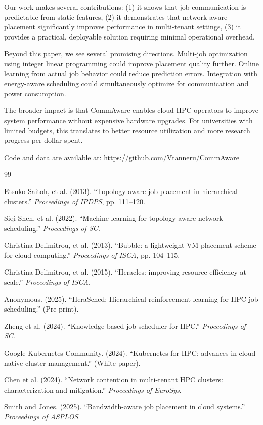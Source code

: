 \documentclass[conference]{IEEEtran}
\begin{document}
Our work makes several contributions: (1) it shows that job communication is predictable from static features, (2) it demonstrates that network-aware placement significantly improves performance in multi-tenant settings, (3) it provides a practical, deployable solution requiring minimal operational overhead.

Beyond this paper, we see several promising directions. Multi-job optimization using integer linear programming could improve placement quality further. Online learning from actual job behavior could reduce prediction errors. Integration with energy-aware scheduling could simultaneously optimize for communication and power consumption.

The broader impact is that CommAware enables cloud-HPC operators to improve system performance without expensive hardware upgrades. For universities with limited budgets, this translates to better resource utilization and more research progress per dollar spent.

Code and data are available at: \url{https://github.com/Vtanneru/CommAware}

\begin{thebibliography}{99}

 Etsuko Saitoh, et al. (2013). ``Topology-aware job placement in hierarchical clusters.'' \textit{Proceedings of IPDPS}, pp. 111--120.

 Siqi Shen, et al. (2022). ``Machine learning for topology-aware network scheduling.'' \textit{Proceedings of SC}.

 Christina Delimitrou, et al. (2013). ``Bubble: a lightweight VM placement scheme for cloud computing.'' \textit{Proceedings of ISCA}, pp. 104--115.

 Christina Delimitrou, et al. (2015). ``Heracles: improving resource efficiency at scale.'' \textit{Proceedings of ISCA}.

 Anonymous. (2025). ``HeraSched: Hierarchical reinforcement learning for HPC job scheduling.'' (Pre-print).

 Zheng et al. (2024). ``Knowledge-based job scheduler for HPC.'' \textit{Proceedings of SC}.

 Google Kubernetes Community. (2024). ``Kubernetes for HPC: advances in cloud-native cluster management.'' (White paper).

 Chen et al. (2024). ``Network contention in multi-tenant HPC clusters: characterization and mitigation.'' \textit{Proceedings of EuroSys}.

 Smith and Jones. (2025). ``Bandwidth-aware job placement in cloud systems.'' \textit{Proceedings of ASPLOS}.

\end{thebibliography}
\end{document}
